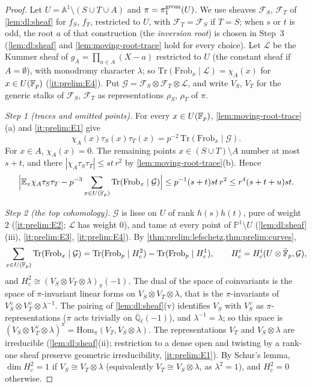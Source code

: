 \begin{proof}
Let $U=\mathbb A^1\setminus(S\cup T\cup A)$ and $\pi=\pi_1^{\rm geom}(U)$. We use
sheaves $\mathcal F_S$, $\mathcal F_T$ of \cref{lem:dl:sheaf} for $f_S$, $f_T$,
restricted to $U$, with $\mathcal F_T=\mathcal F_S$ if $T=S$; when $s$ or $t$ is
odd, the root $a$ of that construction (the \emph{inversion root}) is chosen in
Step~3 (\cref{lem:dl:sheaf} and \cref{lem:moving-root-trace} hold for every
choice). Let $\mathcal L$ be the Kummer sheaf of
$g_A=\prod_{a\in A}(X-a)$ restricted to $U$ (the constant sheaf if
$A=\emptyset$), with monodromy character $\lambda$; so
$\mathrm{Tr}(\mathrm{Frob}_x\mid\mathcal L)=\chi_A(x)$ for $x\in U(\mathbb F_p)$
(\ref{it:prelim:E4}). Put $\mathcal G=\mathcal F_S\otimes\mathcal F_T\otimes\mathcal L$,
and write $V_S$, $V_T$ for the generic stalks of $\mathcal F_S$, $\mathcal F_T$ as
representations $\rho_S$, $\rho_T$ of $\pi$.

\emph{Step 1 (traces and omitted points).} For every $x\in U(\mathbb F_p)$,
\cref{lem:moving-root-trace}(a) and \ref{it:prelim:E1} give
\[
  \chi_A(x)\tau_S(x)\tau_T(x)=p^{-2}\,\mathrm{Tr}(\mathrm{Frob}_x\mid\mathcal G).
\]
For $x\in A$, $\chi_A(x)=0$. The remaining points $x\in(S\cup T)\setminus A$ number at
most $s+t$, and there $|\chi_A\tau_S\tau_T|\le st\,r^2$ by
\cref{lem:moving-root-trace}(b). Hence
\begin{equation}\label{eq:moving-root-omitted}
  \Big|\mathbb E_x\chi_A\tau_S\tau_T-p^{-3}\sum_{x\in U(\mathbb F_p)}
  \mathrm{Tr}(\mathrm{Frob}_x\mid\mathcal G)\Big|
  \le p^{-1}(s+t)st\,r^2\le r^4(s+t+u)st .
\end{equation}

\emph{Step 2 (the top cohomology).} $\mathcal G$ is lisse on $U$ of rank
$h(s)h(t)$, pure of weight $2$ (\ref{it:prelim:E2}; $\mathcal L$ has weight $0$),
and tame at every point of $\mathbb P^1\setminus U$ (\cref{lem:dl:sheaf}(iii),
\ref{it:prelim:E3}, \ref{it:prelim:E4}). By
\cref{thm:prelim:lefschetz,thm:prelim:curves},
\[
  \sum_{x\in U(\mathbb F_p)}\mathrm{Tr}(\mathrm{Frob}_x\mid\mathcal G)
  =\mathrm{Tr}(\mathrm{Frob}_p\mid H^2_c)-\mathrm{Tr}(\mathrm{Frob}_p\mid H^1_c),
  \qquad H^i_c=H^i_c(U\otimes\bar{\mathbb F}_p,\mathcal G),
\]
and $H^2_c\cong(V_S\otimes V_T\otimes\lambda)_\pi(-1)$. The dual of the space of
coinvariants is the space of $\pi$-invariant linear forms on
$V_S\otimes V_T\otimes\lambda$, that is the $\pi$-invariants of
$V_S^\vee\otimes V_T^\vee\otimes\lambda^{-1}$. The pairing of
\cref{lem:dl:sheaf}(v) identifies $V_S$ with $V_S^\vee$ as $\pi$-representations
($\pi$ acts trivially on $\overline{\mathbb Q}_\ell(-1)$), and $\lambda^{-1}=\lambda$;
so this space is $(V_S\otimes V_T^\vee\otimes\lambda)^\pi
=\mathrm{Hom}_\pi(V_T,V_S\otimes\lambda)$. The representations $V_T$ and
$V_S\otimes\lambda$ are irreducible (\cref{lem:dl:sheaf}(ii); restriction to a
dense open and twisting by a rank-one sheaf preserve geometric irreducibility,
\ref{it:prelim:E1}). By Schur's lemma, $\dim H^2_c=1$ if
$V_S\cong V_T\otimes\lambda$ (equivalently $V_T\cong V_S\otimes\lambda$, as
$\lambda^2=1$), and $H^2_c=0$ otherwise.


\end{proof}
